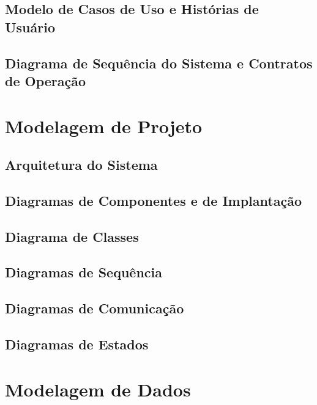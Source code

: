 \documentclass[portuguese]{sbcreviews-2025}%
\begin{document}
\subsection{Modelo de Casos de Uso e Histórias de Usuário}
\label{sec:casosdeuso}

\subsection{Diagrama de Sequência do Sistema e Contratos de Operação}
\label{sec:seqsistema}

\section{Modelagem de Projeto}
\label{sec:projeto}

\subsection{Arquitetura do Sistema}
\label{sec:arquitetura}

\subsection{Diagramas de Componentes e de Implantação}
\label{sec:componentes}

\subsection{Diagrama de Classes}
\label{sec:classes}

\subsection{Diagramas de Sequência}
\label{sec:sequencia}

\subsection{Diagramas de Comunicação}
\label{sec:comunicacao}

\subsection{Diagramas de Estados}
\label{sec:estados}

\section{Modelagem de Dados}
\label{sec:dados}
\end{document}

